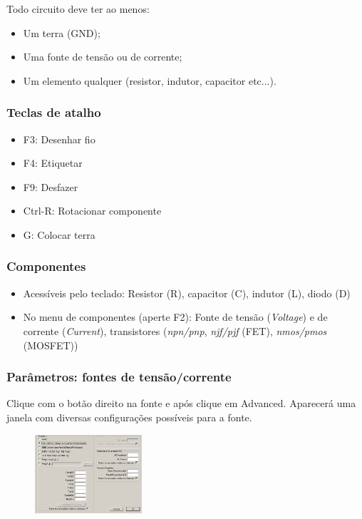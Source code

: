 \documentclass{beamer}
\begin{document}
\begin{frame} %
Todo circuito deve ter ao menos:
\begin{itemize}
\item Um terra (GND);
\item Uma fonte de tensão ou de corrente;
\item Um elemento qualquer (resistor, indutor, capacitor etc...).
\end{itemize}
\end{frame}

\begin{frame} %
\frametitle{Teclas de atalho}
\begin{itemize}
\item{F3:} Desenhar fio
\item{F4:} Etiquetar
\item{F9:} Desfazer 
\item{Ctrl-R:} Rotacionar componente
\item{G:} Colocar terra

\end{itemize}
\end{frame}

\begin{frame} %
\frametitle{Componentes}
\begin{itemize}
\item {Acessíveis pelo teclado:} Resistor (R), capacitor (C), indutor (L), diodo (D)
\item {No menu de componentes (aperte F2)}: Fonte de tensão (\textit{Voltage}) e de corrente (\textit{Current}), transistores (\textit{npn/pnp}, \textit{njf/pjf} (FET), \textit{nmos/pmos} (MOSFET))
\end{itemize}
\end{frame}

\begin{frame} %
\frametitle{Parâmetros: fontes de tensão/corrente}
Clique com o botão direito na fonte e após clique em Advanced. Aparecerá uma janela com diversas configurações possíveis para a fonte.
\begin{figure}[htb]
\includegraphics[width=150px]{images/paramfonte.png}
\end{figure}
\end{frame}
\end{document}
